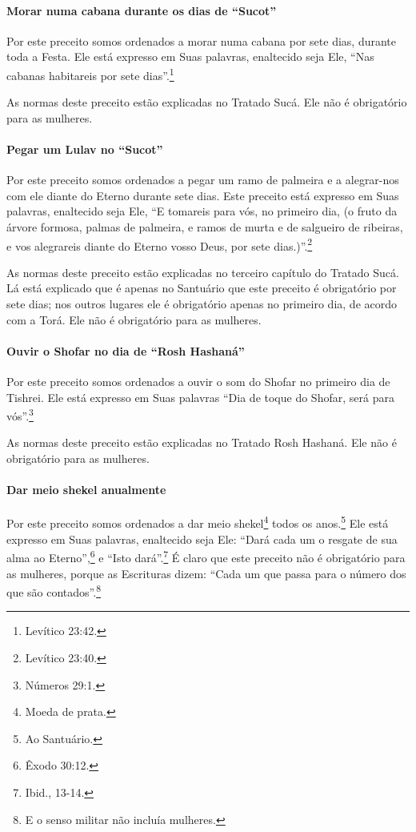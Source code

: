 \paragraph{Morar numa cabana durante os dias de ``Sucot''}

Por este preceito somos ordenados a morar numa cabana por sete dias,
durante toda a Festa. Ele está expresso em Suas palavras, enaltecido
seja Ele, ``Nas cabanas habitareis por sete dias''.\footnote{Levítico 23:42.}

As normas deste preceito estão explicadas no Tratado Sucá. Ele não é
obrigatório para as mulheres.

\paragraph{Pegar um Lulav no ``Sucot''}

Por este preceito somos ordenados a pegar um ramo de palmeira e a
alegrar-nos com ele diante do Eterno durante sete dias. Este preceito
está expresso em Suas palavras, enaltecido seja Ele, ``E tomareis para
vós, no primeiro dia, (o fruto da árvore formosa, palmas de palmeira, e
ramos de murta e de salgueiro de ribeiras, e vos alegrareis diante do
Eterno vosso Deus, por sete dias.)''.\footnote{Levítico 23:40.}

As normas deste preceito estão explicadas no terceiro capítulo do
Tratado Sucá. Lá está explicado que é apenas no Santuário que este
preceito é obrigatório por sete dias; nos outros lugares ele é
obrigatório apenas no primeiro dia, de acordo com a Torá. Ele não é
obrigatório para as mulheres.

\paragraph{Ouvir o Shofar no dia de ``Rosh Hashaná''}

Por este preceito somos ordenados a ouvir o som do Shofar no
primeiro dia de Tishrei. Ele está expresso em Suas palavras ``Dia de
toque do Shofar, será para vós''.\footnote{Números 29:1.}

As normas deste preceito estão explicadas no Tratado Rosh Hashaná. Ele
não é obrigatório para as mulheres.

\paragraph{Dar meio shekel anualmente}

Por este preceito somos ordenados a dar meio
shekel\footnote{Moeda de prata.} todos os anos.\footnote{Ao Santuário.}
Ele está expresso em Suas palavras, enaltecido seja Ele: ``Dará cada um
o resgate de sua alma ao Eterno'',\footnote{Êxodo 30:12.} e ``Isto dará''.\footnote{Ibid., 13-14.} É claro que este preceito não é obrigatório para as mulheres,
porque as Escrituras dizem: ``Cada um que passa para o número dos que
são contados''.\footnote{E o senso militar não incluía mulheres.}

